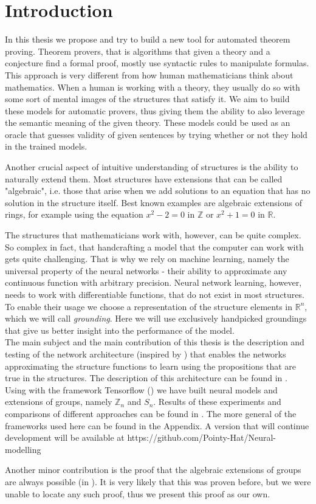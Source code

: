 \chapter*{Introduction}
\label{intro}

In this thesis we propose and try to build a new tool for automated theorem proving. Theorem provers, that is algorithms that given a theory and a conjecture find a formal proof, mostly use syntactic rules to manipulate formulas. This approach is very different from how human mathematicians think about mathematics. When a human is working with a theory, they usually do so with some sort of mental images of the structures that satisfy it. We aim to build these models for automatic provers, thus giving them the ability to also leverage the semantic meaning of the given theory. These models could be used as an oracle that guesses validity of given sentences by trying whether or not they hold in the trained models.

Another crucial aspect of intuitive understanding of structures is the ability to naturally extend them. Most structures have extensions that can be called "algebraic", i.e. those that arise when we add solutions to an equation that has no solution in the structure itself. Best known examples are algebraic extensions of rings, for example using the equation $x^2-2=0$ in $\mathbb{Z}$ or $x^2+1=0$ in $\mathbb{R}$.

The structures that mathematicians work with, however, can be quite complex. So complex in fact, that handcrafting a model that the computer can work with gets quite challenging. That is why we rely on machine learning, namely the universal property of the neural networks - their ability to approximate any continuous function with arbitrary precision. Neural network learning, however, needs to work with differentiable functions, that do not exist in most structures. To enable their usage we choose a representation of the structure elements in $\mathbb{R}^n$, which we will call \textit{grounding}. Here we will use exclusively handpicked groundings that give us better insight into the performance of the model.\\

The main subject and the main contribution of this thesis is the description and testing of the network architecture (inspired by \cite{serafini}) that enables the networks approximating the structure functions to learn using the propositions that are true in the structures. The description of this architecture can be found in . Using with the framework Tensorflow (\cite{tf}) we have built neural models and extensions of groups, namely $\mathbb{Z}_n$ and $S_n$. Results of these experiments and comparisons of different approaches can be found in . The more general of the frameworks used here can be found in the Appendix. A version that will continue development will be available at https://github.com/Pointy-Hat/Neural-modelling

Another minor contribution is the proof that the algebraic extensions of groups are always possible (in ). It is very likely that this was proven before, but we were unable to locate any such proof, thus we present this proof as our own.